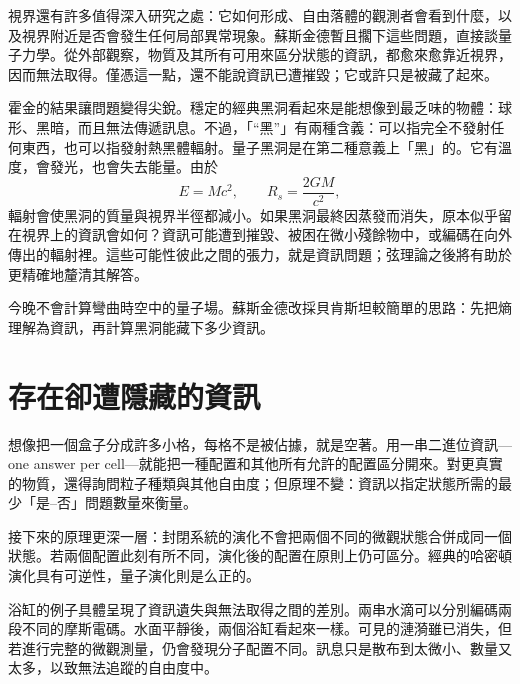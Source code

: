 視界還有許多值得深入研究之處：它如何形成、自由落體的觀測者會看到什麼，以及視界附近是否會發生任何局部異常現象。蘇斯金德暫且擱下這些問題，直接談量子力學。從外部觀察，物質及其所有可用來區分狀態的資訊，都愈來愈靠近視界，因而無法取得。僅憑這一點，還不能說資訊已遭摧毀；它或許只是被藏了起來。

霍金的結果讓問題變得尖銳。穩定的經典黑洞看起來是能想像到最乏味的物體：球形、黑暗，而且無法傳遞訊息。不過，「``黑''」有兩種含義：可以指完全不發射任何東西，也可以指發射熱黑體輻射。量子黑洞是在第二種意義上「黑」的。它有溫度，會發光，也會失去能量。由於
\begin{equation}
E=Mc^2,
\qquad
R_s=\frac{2GM}{c^2},
\end{equation}
輻射會使黑洞的質量與視界半徑都減小。如果黑洞最終因蒸發而消失，原本似乎留在視界上的資訊會如何？資訊可能遭到摧毀、被困在微小殘餘物中，或編碼在向外傳出的輻射裡。這些可能性彼此之間的張力，就是資訊問題；弦理論之後將有助於更精確地釐清其解答。

今晚不會計算彎曲時空中的量子場。蘇斯金德改採貝肯斯坦較簡單的思路：先把熵理解為資訊，再計算黑洞能藏下多少資訊。

\section{存在卻遭隱藏的資訊}

想像把一個盒子分成許多小格，每格不是被佔據，就是空著。用一串二進位資訊---one answer per cell---就能把一種配置和其他所有允許的配置區分開來。對更真實的物質，還得詢問粒子種類與其他自由度；但原理不變：資訊以指定狀態所需的最少「是--否」問題數量來衡量。

\begin{classroomqa}
\end{classroomqa}

接下來的原理更深一層：封閉系統的演化不會把兩個不同的微觀狀態合併成同一個狀態。若兩個配置此刻有所不同，演化後的配置在原則上仍可區分。經典的哈密頓演化具有可逆性，量子演化則是么正的。

浴缸的例子具體呈現了資訊遺失與無法取得之間的差別。兩串水滴可以分別編碼兩段不同的摩斯電碼。水面平靜後，兩個浴缸看起來一樣。可見的漣漪雖已消失，但若進行完整的微觀測量，仍會發現分子配置不同。訊息只是散布到太微小、數量又太多，以致無法追蹤的自由度中。

